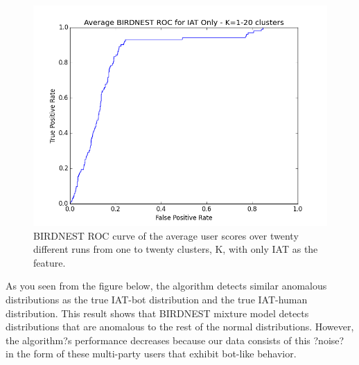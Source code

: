 \documentclass{article} %
\begin{document}
\begin{figure}[h]
\centering
{\caption{BIRDNEST ROC curve of the average user scores over twenty different runs from one to twenty clusters, K, with only IAT as the feature.} \includegraphics[scale=0.47]{img/bird_iat_roc.png}}
\end{figure}

As you seen from the figure below, the algorithm detects similar anomalous distributions as the true IAT-bot distribution and the true IAT-human distribution. This result shows that BIRDNEST mixture model detects distributions that are anomalous to the rest of the normal distributions. However, the algorithm?s performance decreases because our data consists of this ?noise? in the form of these multi-party users that exhibit bot-like behavior.


\end{document}
